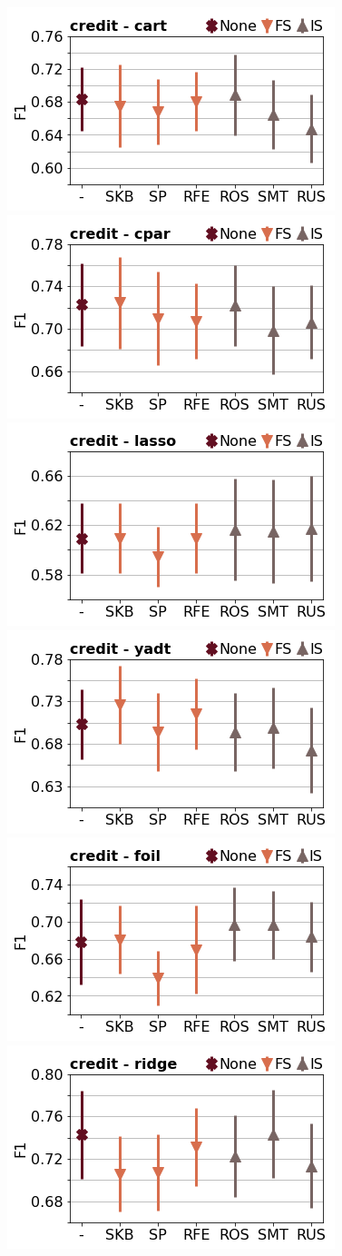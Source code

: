\documentclass[runningheads,a4paper]{llncs}
\begin{document}
\begin{figure}[!h]
\includegraphics[width=0.32\linewidth]{fig/preps_credit_DT_sklearn_f1score.png}
\includegraphics[width=0.32\linewidth]{fig/preps_credit_RB_cpar_f1score.png}
\includegraphics[width=0.32\linewidth]{fig/preps_credit_LM_lasso_f1score.png}
\includegraphics[width=0.32\linewidth]{fig/preps_credit_DT_yadt_f1score.png}
\includegraphics[width=0.32\linewidth]{fig/preps_credit_RB_foil_f1score.png}
\includegraphics[width=0.32\linewidth]{fig/preps_credit_LM_ridge_f1score.png}
\end{figure}
\end{document}
